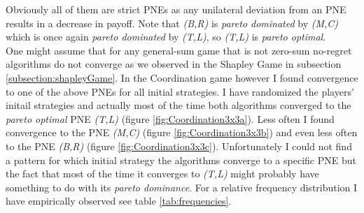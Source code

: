 Obviously all of them are strict PNEs as any unilateral deviation from an PNE results in a decrease in payoff. Note that \textit{(B,R)} is \textit{pareto dominated} by \textit{(M,C)} which is once again \textit{pareto dominated} by \textit{(T,L)}, so \textit{(T,L)} is \textit{pareto optimal}. \\

One might assume that for any general-sum game that is not zero-sum no-regret algorithms do not converge as we observed in the Shapley Game in subsection \ref{subsection:shapleyGame}. In the Coordination game however I found convergence to one of the above PNEs for all initial strategies. I have randomized the players' initail strategies and actually most of the time both algorithms converged to the \textit{pareto optimal} PNE \textit{(T,L)} (figure \ref{fig:Coordination3x3a}). Less often I found convergence to the PNE \textit{(M,C)} (figure \ref{fig:Coordination3x3b}) and even less often to the PNE \textit{(B,R)} (figure \ref{fig:Coordination3x3c}). Unfortunately I could not find a pattern for which initial strategy the algorithms converge to a specific PNE but the fact that most of the time it converges to \textit{(T,L)} might probably have something to do with its \textit{pareto dominance}. For a relative frequency distribution I have empirically observed see table \ref{tab:frequencies}.

